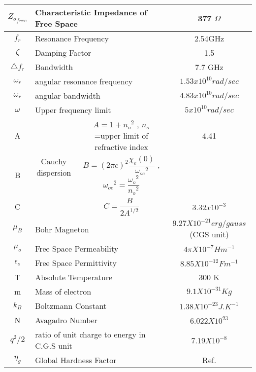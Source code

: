 \documentclass[journal]{IEEEtran}
\begin{document}
\begin{table*}[t]
\begin{tabular}{|c|c|c|c|}
		${Z_{o}}_{free}$ & \multicolumn{2}{|l|}{Characteristic Impedance of Free Space} & 377 $\Omega$ \\
		\hline
		$f_r$ & \multicolumn{2}{|l|}{Resonance Frequency} & 2.54GHz \\
		\hline
		$\zeta$ &\multicolumn{2}{|l|}{ Damping Factor} & 1.5 \\
		\hline
		$\triangle f_r$ & \multicolumn{2}{|l|}{Bandwidth} & 7.7 GHz \\
		\hline
		$\omega_r$ & \multicolumn{2}{|l|}{angular resonance frequency} & $ 1.53x10^{10} rad/sec$ \\
		\hline
		$\omega_r$ & \multicolumn{2}{|l|}{angular bandwidth } & $ 4.83x10^{10} rad/sec$ \\
		\hline
		$\omega$ &\multicolumn{2}{|l|}{ Upper frequency limit}  & $5 x 10^{10} rad/sec$ \\
		\hline
		A &\multirow{3}{*}{ Cauchy  dispersion}  & $A = 1+ {n_o}^2$ ,
		$n_o $ \tiny{=upper limit of refractive index }& 4.41\\
		\cline{1-1} \cline{3-4}
		B              &             &      $B = (2 \pi c)^2 \dfrac{\chi_e(0)}{{\omega_{oe}}^2}$     ,   $ {\omega_{oe}}^2 = \dfrac{{\omega_o}^2}{{n_o}^2}$    &      \\
		\cline{1-1} \cline{3-4}
		C              &              &    $C= \dfrac{B}{2 A^{1/2}}$              & $3.32x10^{-3}$       \\
		\cline{1-1} \cline{3-4}
		\hline
		$\mu_B$ & \multicolumn{2}{|l|}{Bohr Magneton } & $9.27 X 10^{-21} erg/ gauss$ (CGS unit) \\
		\hline
		$\mu_o$ &  \multicolumn{2}{|l|}{Free Space Permeability} &  $4 \pi X 10^{-7} Hm^{-1}$ \\
		\hline
		$\epsilon_o$ & \multicolumn{2}{|l|}{Free Space Permittivity} & $8.85 X 10^{-12} F m^{-1}$ \\
		\hline
		T & \multicolumn{2}{|l|}{ Absolute Temperature} & 300 K \\
		\hline
		m & \multicolumn{2}{|l|}{ Mass of electron} & $9.1 X 10 ^{-31} Kg $ \\
		\hline
		$k_B$ & \multicolumn{2}{|l|}{Boltzmann Constant } & $1.38 X 10 ^{-23} J.K^{-1}$ \\
		\hline
		N & \multicolumn{2}{|l|}{Avagadro Number } & $6.022 X 10 ^{23}$ \\
		\hline
		$q^2 /2 $ & \multicolumn{2}{|l|}{ratio of unit charge to energy in C.G.S unit} & $7.19 X 10^{-8}$ \\
		\hline
		$\eta_g$ & \multicolumn{2}{|l|}{Global Hardness Factor} & Ref. \cite{ghosh2002theoretical} \\
		\hline
	\end{tabular}
\end{table*}
\end{document}
